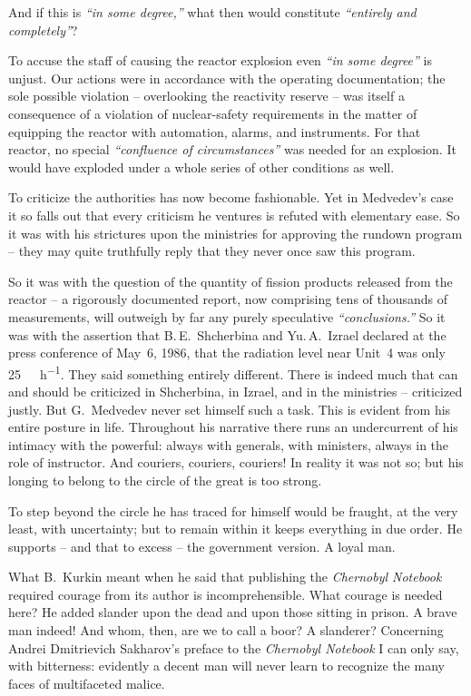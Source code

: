 \documentclass[openright]{bookest}
\begin{document}
And if this is \textit{``in some degree,''} what then would constitute \textit{``entirely and completely''}?

To accuse the staff of causing the reactor explosion even \textit{``in some degree''} is unjust. Our actions were in accordance with the operating documentation; the sole possible violation -- overlooking the reactivity reserve -- was itself a consequence of a violation of nuclear-safety requirements in the matter of equipping the reactor with automation, alarms, and instruments. For that reactor, no special \textit{``confluence of circumstances''} was needed for an explosion. It would have exploded under a whole series of other conditions as well.

To criticize the authorities has now become fashionable. Yet in Medvedev's case it so falls out that every criticism he ventures is refuted with elementary ease. So it was with his strictures upon the ministries for approving the rundown program -- they may quite truthfully reply that they never once saw this program.

So it was with the question of the quantity of fission products released from the reactor -- a rigorously documented report, now comprising tens of thousands of measurements, will outweigh by far any purely speculative \textit{``conclusions.''} So it was with the assertion that B.\,E.~Shcherbina and Yu.\,A.~Izrael declared at the press conference of May~6, 1986, that the radiation level near Unit~4 was only \qty{25}{\milli\roentgen\per\hour}. They said something entirely different. There is indeed much that can and should be criticized in Shcherbina, in Izrael, and in the ministries -- criticized justly. But G.~Medvedev never set himself such a task. This is evident from his entire posture in life. Throughout his narrative there runs an undercurrent of his intimacy with the powerful: always with generals, with ministers, always in the role of instructor. And couriers, couriers, couriers! In reality it was not so; but his longing to belong to the circle of the great is too strong.

To step beyond the circle he has traced for himself would be fraught, at the very least, with uncertainty; but to remain within it keeps everything in due order. He supports -- and that to excess -- the government version. A loyal man.

What B.~Kurkin meant when he said that publishing the \textit{Chernobyl Notebook} required courage from its author is incomprehensible. What courage is needed here? He added slander upon the dead and upon those sitting in prison. A brave man indeed! And whom, then, are we to call a boor? A slanderer? Concerning Andrei Dmitrievich Sakharov's preface to the \textit{Chernobyl Notebook} I can only say, with bitterness: evidently a decent man will never learn to recognize the many faces of multifaceted malice.
\end{document}
